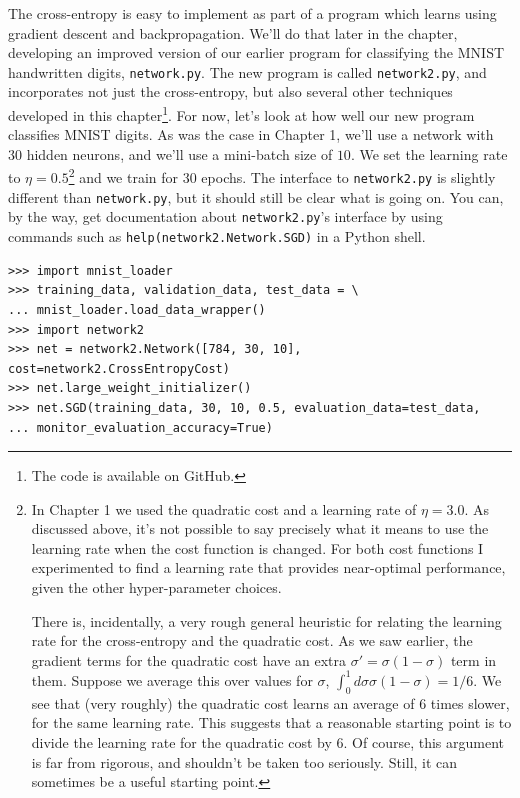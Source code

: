 \documentclass[a4paper,11pt,twoside]{report}
\begin{document}
The cross-entropy is easy to implement as part of a program which learns using gradient descent and backpropagation. We'll do that later in the chapter, developing an improved version of our earlier program for classifying the MNIST handwritten digits, \texttt{network.py}. The new program is called \texttt{network2.py}, and incorporates not just the cross-entropy, but also several other techniques developed in this chapter\footnote{The code is available on GitHub.}. For now, let's look at how well our new program classifies MNIST digits. As was the case in Chapter 1, we'll use a network with $30$ hidden neurons, and we'll use a mini-batch size of $10$. We set the learning rate to $\eta=0.5$\footnote{In Chapter 1 we used the quadratic cost and a learning rate of $\eta=3.0$. As discussed above, it's not possible to say precisely what it means to use the  learning rate when the cost function is changed. For both cost functions I experimented to find a learning rate that provides near-optimal performance, given the other hyper-parameter choices.

There is, incidentally, a very rough general heuristic for relating the learning rate for the cross-entropy and the quadratic cost. As we saw earlier, the gradient terms for the quadratic cost have an extra $\sigma'=\sigma(1-\sigma)$ term in them. Suppose we average this over values for $\sigma$, $\int_0^1d\sigma\sigma(1-\sigma)=1/6$. We see that (very roughly) the quadratic cost learns an average of 6 times slower, for the same learning rate. This suggests that a reasonable starting point is to divide the learning rate for the quadratic cost by 6. Of course, this argument is far from rigorous, and shouldn't be taken too seriously. Still, it can sometimes be a useful starting point.} and we train for $30$ epochs. The interface to \texttt{network2.py} is slightly different than \texttt{network.py}, but it should still be clear what is going on. You can, by the way, get documentation about \texttt{network2.py}'s interface by using commands such as \texttt{help(network2.Network.SGD)} in a Python shell.


\begin{lstlisting}
>>> import mnist_loader
>>> training_data, validation_data, test_data = \
... mnist_loader.load_data_wrapper()
>>> import network2
>>> net = network2.Network([784, 30, 10], cost=network2.CrossEntropyCost)
>>> net.large_weight_initializer()
>>> net.SGD(training_data, 30, 10, 0.5, evaluation_data=test_data,
... monitor_evaluation_accuracy=True)
\end{lstlisting}
\end{document}
